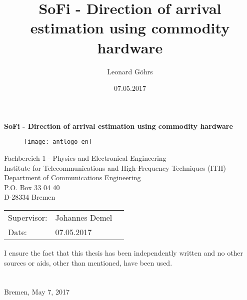 \thispagestyle{empty}
\title{SoFi - Direction of arrival estimation using commodity hardware}
\author{Leonard Göhrs}
\date{07.05.2017}

\begin{titlepage}
  \noindent

  \vspace{55 mm}

  \begin{center}
    \begin{huge}
      \textbf{SoFi - Direction of arrival estimation using commodity hardware}
    \end{huge}
  \end{center}

  \vspace{55 mm}

  \begin{figure}[H]
    \centering
    \texttt{[image: antlogo\_en]}
    \\
    \label{img:FrontPage}
  \end{figure}

  \begin{center}
    Fachbereich 1 - Physics and Electronical Engineering \\
    Institute for Telecommunications and High-Frequency Techniques (ITH) \\
    Department of Communications Engineering \\
    P.O. Box 33 04 40 \\
    D-28334 Bremen \\
  \end{center}

  \vfill

  \begin{center}
    \begin{tabular}{lll}
      Supervisor: & Johannes Demel \\
      Date: & 07.05.2017
    \end{tabular}
  \end{center}

  \vspace{5mm}
  \noindent I ensure the fact that this thesis has been independently written and no other
  sources or aids, other than mentioned, have been used. \\ \\ \\
  Bremen, May 7, 2017 \hspace{5mm} \hrulefill

  \newpage
\end{titlepage}
